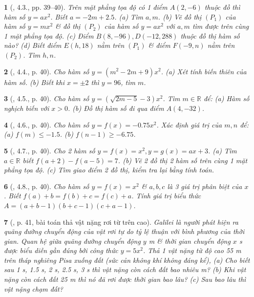 \documentclass{article}
\newtheorem{baitoan}{}
\begin{document}
\begin{baitoan}[\cite{Binh_boi_duong_Toan_9_tap_2}, 4.3., pp. 39--40]
	Trên mặt phẳng tọa độ có 1 điểm $A(2,-6)$ thuộc đồ thì hàm số $y = ax^2$. Biết $a = -2m + 2.5$. (a) Tìm $a,m$. (b) Vẽ đồ thị $(P_1)$ của hàm số $y = mx^2$ \& đồ thị $(P_2)$ của hàm số $y = ax^2$ với $a,m$ tìm được trên cùng 1 mặt phẳng tọa độ. (c) Điểm $B(8,-96),D(-12,288)$ thuộc đồ thị hàm số nào? (d) Biết điểm $E(h,18)$ nằm trên $(P_1)$ \& điểm $F(-9,n)$ nằm trên $(P_2)$. Tìm $h,n$.
\end{baitoan}

\begin{baitoan}[\cite{Binh_boi_duong_Toan_9_tap_2}, 4.4., p. 40]
	Cho hàm số $y = (m^2 - 2m + 9)x^2$. (a) Xét tính biến thiên của hàm số. (b) Biết khi $x = \pm2$ thì $y = 96$, tìm $m$.
\end{baitoan}

\begin{baitoan}[\cite{Binh_boi_duong_Toan_9_tap_2}, 4.5., p. 40]
	Cho hàm số $y = (\sqrt{2m - 5} - 3)x^2$. Tìm $m\in\mathbb{R}$ để: (a) Hàm số nghịch biến với $x > 0$. (b) Đồ thị hàm số đi qua điểm $A(4,-32)$.
\end{baitoan}

\begin{baitoan}[\cite{Binh_boi_duong_Toan_9_tap_2}, 4.6., p. 40]
	Cho hàm số $y = f(x) = -0.75x^2$. Xác định giá trị của $m,n$ để: (a) $f(m)\le-1.5$. (b) $f(n - 1)\ge-6.75$.
\end{baitoan}

\begin{baitoan}[\cite{Binh_boi_duong_Toan_9_tap_2}, 4.7., p. 40]
	Cho 2 hàm số $y = f(x) = x^2,y = g(x) = ax + 3$. (a) Tìm $a\in\mathbb{R}$ biết $f(a + 2) - f(a - 5) = 7$. (b) Vẽ 2 đồ thị 2 hàm số trên cùng 1 mặt phẳng tọa độ. (c) Tìm giao điểm 2 đồ thị, kiểm tra lại bằng tính toán.
\end{baitoan}

\begin{baitoan}[\cite{Binh_boi_duong_Toan_9_tap_2}, 4.8., p. 40]
	Cho hàm số $y = f(x) = x^2$ \& $a,b,c$ là 3 giá trị phân biệt của $x$. Biết $f(a) + b = f(b) + c = f(c) + a$. Tính giá trị biểu thức $A = (a + b - 1)(b + c - 1)(c + a - 1)$.
\end{baitoan}

\begin{baitoan}[\cite{Binh_boi_duong_Toan_9_tap_2}, p. 41, bài toán thả vật nặng rơi từ trên cao]
	Galilei là người phát hiện ra quãng đường chuyển động của vật rơi tự do tỷ lệ thuận với bình phương của thời gian. Quan hệ giữa quãng đường chuyển động $y$ {\rm m} \& thời gian chuyển động $x$ {\rm s} được biểu diễn gần đúng bởi công thức $y = 5x^2$. Thả 1 vật nặng từ độ cao {\rm55 m} trên tháp nghiêng Pisa xuống đất (sức cản không khí không đáng kể), (a) Cho biết sau {\rm1 s, 1.5 s, 2 s, 2.5 s, 3 s} thì vật nặng còn cách đất bao nhiêu {\rm m}? (b) Khi vật nặng còn cách đất {\rm25 m} thì nó đã rơi được thời gian bao lâu? (c) Sau bao lâu thì vật nặng chạm đất?
\end{baitoan}
\end{document}
